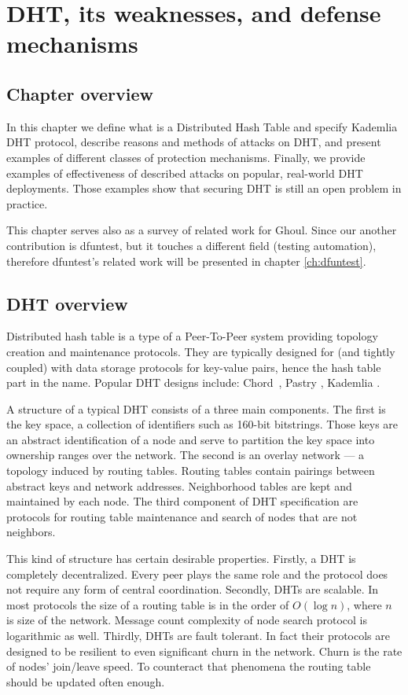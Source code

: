 \chapter{DHT, its weaknesses, and defense mechanisms}
\label{ch:threats}
\section{Chapter overview}
  In this chapter we define what is a Distributed Hash Table and specify
  Kademlia DHT protocol, describe reasons and methods of attacks on DHT, and
  present examples of different classes of protection mechanisms.
  Finally, we provide examples of effectiveness of described attacks on popular,
  real-world DHT deployments.
  Those examples show that securing DHT is still an open problem in practice.

  This chapter serves also as a survey of related work for Ghoul.
  Since our another contribution is dfuntest, but it touches a different field 
  (testing automation), therefore dfuntest's related work will be presented in
  chapter \ref{ch:dfuntest}.

\section{DHT overview}

  Distributed hash table is a type of a Peer-To-Peer system providing topology
  creation and maintenance protocols.
  They are typically designed for (and tightly coupled) with data storage
  protocols for key-value pairs, hence the hash table part in the name.
  Popular DHT designs include: Chord~\cite{sto03}, Pastry \cite{row01}, Kademlia
  \cite{may02}.

  A structure of a typical DHT consists of a three main components. The first is
  the key space, a collection of identifiers such as 160-bit bitstrings.
  Those keys are an abstract identification of a node and serve to partition the
  key space into ownership ranges over the network.
  The second is an overlay network --- a topology induced by routing tables.
  Routing tables contain pairings between abstract keys and network addresses.
  Neighborhood tables are kept and maintained by each node.
  The third component of DHT specification are protocols for routing table
  maintenance and search of nodes that are not neighbors.

  This kind of structure has certain desirable properties. Firstly, a DHT is
  completely decentralized. Every peer plays the same role and the protocol does
  not require any form of central coordination.
  Secondly, DHTs are scalable.
  In most protocols the size of a routing table is in the order of $O(\log n)$,
  where $n$ is size of the network. Message count complexity of node search
  protocol is logarithmic as well. Thirdly, DHTs are fault tolerant. In fact
  their protocols are designed to be resilient to even significant churn in the
  network. Churn is the rate of nodes' join/leave speed. To counteract that
  phenomena the routing table should be updated often enough.
 
